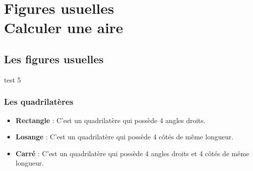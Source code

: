 \documentclass[a4paper]{book}
\begin{document}
\setcounter{chapter}{14} 
\renewcommand{\monTitre}{Figures usuelles \\ Calculer une aire}
\chapter{\monTitre}
\thispagestyle{fancy}

\section{Les figures usuelles}

test 5

\subsection{Les quadrilatères}

    \begin{definition}
        \begin{itemize}
            \item \textbf{Rectangle} : C'est un quadrilatère qui possède 4 angles droits.
            \item \textbf{Losange} : C'est un quadrilatère qui possède 4 côtés de même longueur.
            \item \textbf{Carré} : C'est un quadrilatère qui possède 4 angles droits et 4 côtés de même longueur.
        \end{itemize}
    \end{definition}
    
\end{document}
